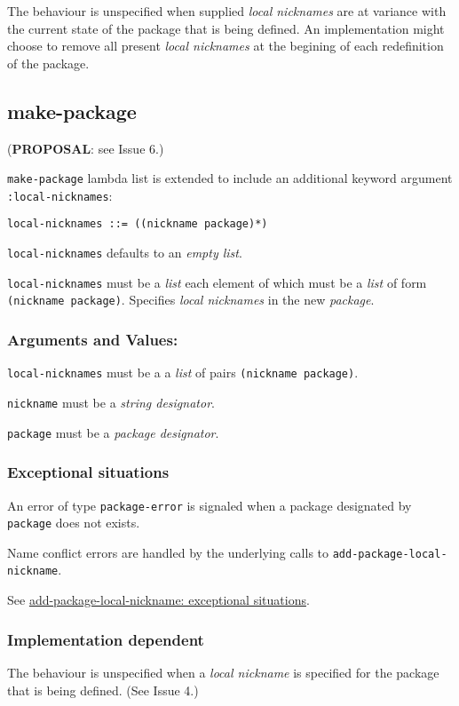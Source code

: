 \documentclass[11pt]{article}
\begin{document}
The behaviour is unspecified when supplied \emph{local nicknames} are at variance with
the current state of the package that is being defined. An implementation might
choose to remove all present \emph{local nicknames} at the begining of each
redefinition of the package.
\subsection{make-package}
\label{sec:org57ff19a}
(\textbf{PROPOSAL}: see Issue 6.)

\texttt{make-package} lambda list is extended to include an additional keyword argument
\texttt{:local-nicknames}:
\begin{verbatim}
local-nicknames ::= ((nickname package)*)
\end{verbatim}


\texttt{local-nicknames} defaults to an \emph{empty list}.

\texttt{local-nicknames} must be a \emph{list} each element of which must be a \emph{list} of form
\texttt{(nickname package)}. Specifies \emph{local nicknames} in the new \emph{package}.
\subsubsection{Arguments and Values:}
\label{sec:orge6d8a5a}
\texttt{local-nicknames} must be a a \emph{list} of pairs \texttt{(nickname package)}.

\texttt{nickname} must be a \emph{string designator}.

\texttt{package} must be a \emph{package designator}.
\subsubsection{Exceptional situations}
\label{sec:org67309e4}
An error of type \texttt{package-error} is signaled when a package designated by
\texttt{package} does not exists.

Name conflict errors are handled by the underlying calls to
\texttt{add-package-local-nickname}.

See \hyperref[sec:org22e3196]{add-package-local-nickname: exceptional situations}.
\subsubsection{Implementation dependent}
\label{sec:orgbdcf478}
The behaviour is unspecified when a \emph{local nickname} is specified for the package
that is being defined. (See Issue 4.)
\end{document}
